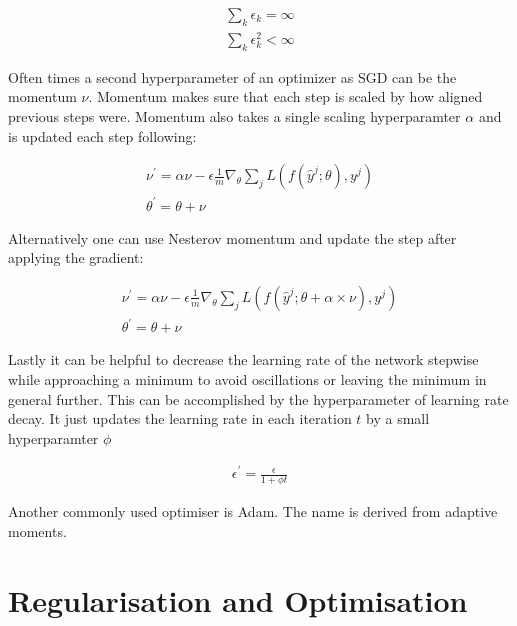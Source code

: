 \begin{align}
    \sum_k \epsilon_k = \infty\\
    \sum_k \epsilon_k^2 < \infty
\end{align}

Often times a second hyperparameter of an optimizer as SGD can be the momentum $\nu$. Momentum makes sure that each step is scaled  by how aligned previous steps were. Momentum also takes a single scaling hyperparamter $\alpha$ and is updated each step following:

\begin{align}
    \nu^{\prime} = \alpha \nu - \epsilon \frac{1}{m} \nabla_{\theta} \sum_j L(f(\hat{y}^j; \theta), y^j)\\
    \theta^{\prime} = \theta + \nu
\end{align}

Alternatively one can use Nesterov momentum and update the step after applying the gradient:

\begin{align}
    \nu^{\prime} = \alpha \nu - \epsilon \frac{1}{m} \nabla_{\theta} \sum_j L(f(\hat{y}^j; \theta + \alpha \times \nu), y^j)\\
    \theta^{\prime} = \theta + \nu
\end{align}

Lastly it can be helpful to decrease the learning rate of the network stepwise while approaching a minimum to avoid oscillations or leaving the minimum in general further. This can be accomplished by the hyperparameter of learning rate decay. It just updates the learning rate in each iteration $t$ by a small hyperparamter $\phi$

\begin{align}
    \epsilon^{\prime} = \frac{\epsilon}{1 + \phi t}
\end{align}

Another commonly used optimiser is Adam. The name is derived from adaptive moments.

\section{Regularisation and Optimisation}

